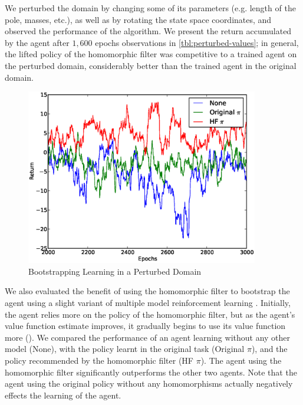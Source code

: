 We perturbed the domain by changing some of its parameters (e.g. length
of the pole, masses, etc.), as well as by rotating the state space
coordinates, and observed the performance of the algorithm. We present
the return accumulated by the agent after $1,600$ epochs observations in
\autoref{tbl:perturbed-values}; in general, the lifted policy of the
homomorphic filter was competitive to a trained agent on the perturbed
domain, considerably better than the trained agent in the original
domain.

\begin{figure}
  \centering
  \includegraphics[width=4in]{figures/bootstrap}
  \caption{Bootstrapping Learning in a Perturbed Domain}
  \label{fig:bootstrap}
\end{figure}

We also evaluated the benefit of using the homomorphic filter to
bootstrap the agent using a slight variant of multiple model
reinforcement learning \citep{Doya2002}. Initially, the agent relies
more on the policy of the homomorphic filter, but as the agent's value
function estimate improves, it gradually begins to use its value
function more (). We compared the performance of
an agent learning without any other model (None), with the policy learnt
in the original task (Original $\pi$), and the policy recommended by the
homomorphic filter (HF $\pi$). The agent using the homomorphic filter
significantly outperforms the other two agents. Note that the agent
using the original policy without any homomorphisms actually negatively
effects the learning of the agent.


